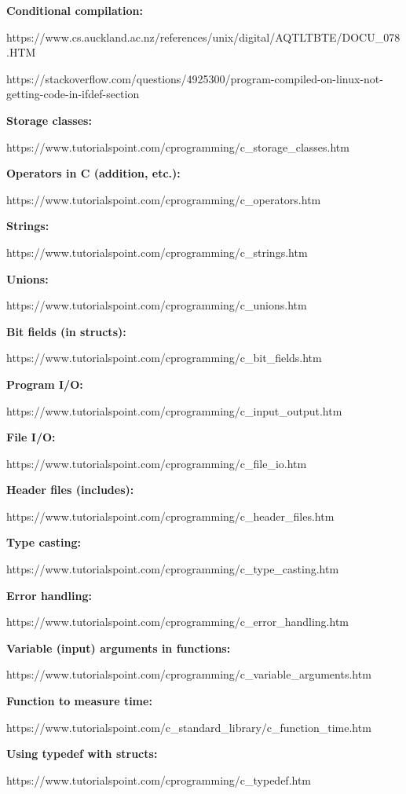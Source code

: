 \documentclass[11pt]{article}
\begin{document}
\textbf{Conditional compilation:}

https://www.cs.auckland.ac.nz/references/unix/digital/AQTLTBTE/DOCU\_078.HTM

https://stackoverflow.com/questions/4925300/program-compiled-on-linux-not-getting-code-in-ifdef-section

\textbf{Storage classes:}

https://www.tutorialspoint.com/cprogramming/c\_storage\_classes.htm

\textbf{Operators in C (addition, etc.):}

https://www.tutorialspoint.com/cprogramming/c\_operators.htm

\textbf{Strings:}

https://www.tutorialspoint.com/cprogramming/c\_strings.htm

\textbf{Unions:}

https://www.tutorialspoint.com/cprogramming/c\_unions.htm

\textbf{Bit fields (in structs):}

https://www.tutorialspoint.com/cprogramming/c\_bit\_fields.htm

\textbf{Program I/O:}

https://www.tutorialspoint.com/cprogramming/c\_input\_output.htm

\textbf{File I/O:}

https://www.tutorialspoint.com/cprogramming/c\_file\_io.htm

\textbf{Header files (includes):}

https://www.tutorialspoint.com/cprogramming/c\_header\_files.htm

\textbf{Type casting:}

https://www.tutorialspoint.com/cprogramming/c\_type\_casting.htm

\textbf{Error handling:}

https://www.tutorialspoint.com/cprogramming/c\_error\_handling.htm

\textbf{Variable (input) arguments in functions:}

https://www.tutorialspoint.com/cprogramming/c\_variable\_arguments.htm

\textbf{Function to measure time:}

https://www.tutorialspoint.com/c\_standard\_library/c\_function\_time.htm

\textbf{Using typedef with structs:}

https://www.tutorialspoint.com/cprogramming/c\_typedef.htm
\end{document}
